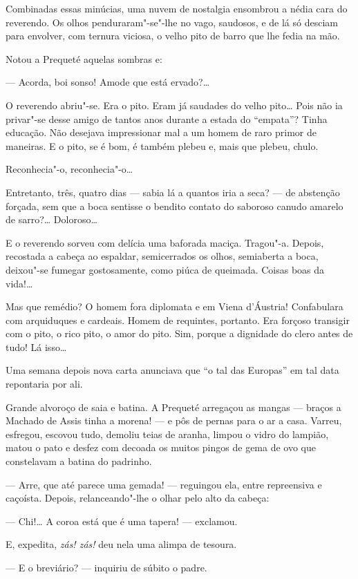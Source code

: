 Combinadas essas minúcias, uma nuvem de nostalgia ensombrou a nédia cara
do reverendo. Os olhos penduraram"-se"-lhe no vago, saudosos, e de lá só
desciam para envolver, com ternura viciosa, o velho pito de barro que
lhe fedia na mão.

Notou a Prequeté aquelas sombras e:

--- Acorda, boi sonso! Amode que está ervado?\ldots{}

O reverendo abriu"-se. Era o pito. Eram já saudades do velho pito\ldots{} Pois
não ia privar"-se desse amigo de tantos anos durante a estada do
``empata''? Tinha educação. Não desejava impressionar mal a um homem de
raro primor de maneiras. E o pito, se é bom, é também plebeu e, mais que
plebeu, chulo.

Reconhecia"-o, reconhecia"-o\ldots{}

Entretanto, três, quatro dias --- sabia lá a quantos iria a seca? --- de
abstenção forçada, sem que a boca sentisse o bendito contato do saboroso
canudo amarelo de sarro?\ldots{} Doloroso\ldots{}

E o reverendo sorveu com delícia uma baforada maciça. Tragou"-a. Depois,
recostada a cabeça ao espaldar, semicerrados os olhos, semiaberta a
boca, deixou"-se fumegar gostosamente, como piúca de queimada. Coisas
boas da vida!\ldots{}

Mas que remédio? O homem fora diplomata e em Viena d'Áustria!
Confabulara com arquiduques e cardeais. Homem de requintes, portanto.
Era forçoso transigir com o pito, o rico pito, o amor do pito. Sim,
porque a dignidade do clero antes de tudo! Lá isso\ldots{}

Uma semana depois nova carta anunciava que ``o tal das Europas'' em tal
data repontaria por ali.

Grande alvoroço de saia e batina. A Prequeté arregaçou as mangas ---
braços a Machado de Assis tinha a morena! --- e pôs de pernas para o ar
a casa. Varreu, esfregou, escovou tudo, demoliu teias de aranha, limpou
o vidro do lampião, matou o pato e desfez com decoada os muitos pingos
de gema de ovo que constelavam a batina do padrinho.

--- Arre, que até parece uma gemada! --- reguingou ela, entre
repreensiva e caçoísta. Depois, relanceando"-lhe o olhar pelo alto da
cabeça:

--- Chi!\ldots{} A coroa está que é uma tapera! --- exclamou.

E, expedita, \emph{zás! zás!} deu nela uma alimpa de tesoura.

--- E o breviário? --- inquiriu de súbito o padre.

